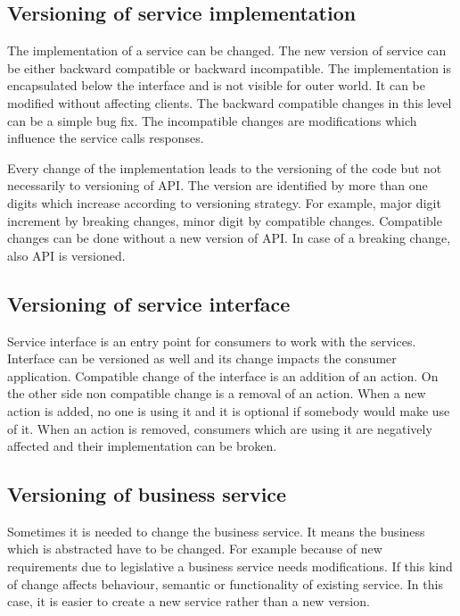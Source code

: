 \subsection{Versioning of service implementation}
The implementation of a service can be changed. The new version of service can be either backward compatible or backward incompatible. The implementation is encapsulated below the interface and is not visible for outer world. It can be modified without affecting clients. The backward compatible changes in this level can be a simple bug fix. The incompatible changes are modifications which influence the service calls responses.

Every change of the implementation leads to the versioning of the code but not necessarily to versioning of API. The version are identified by more than one digits which increase according to versioning strategy. For example, major digit increment by breaking changes, minor digit by compatible changes. Compatible changes can be done without a new version of API. In case of a breaking change, also API is versioned. 

\subsection{Versioning of service interface}
Service interface is an entry point for consumers to work with the services. Interface can be versioned as well and its change impacts the consumer application. Compatible change of the interface is an addition of an action. On the other side non compatible change is a removal of an action. When a new action is added, no one is using it and it is optional if somebody would make use of it. When an action is removed, consumers which are using it are negatively affected and their implementation can be broken.

\subsection{Versioning of business service}
Sometimes it is needed to change the business service. It means the business which is abstracted have to be changed. For example because of new requirements due to legislative a business service needs modifications. If this kind of change affects behaviour, semantic or functionality of existing service. In this case, it is easier to create a new service rather than a new version. 
